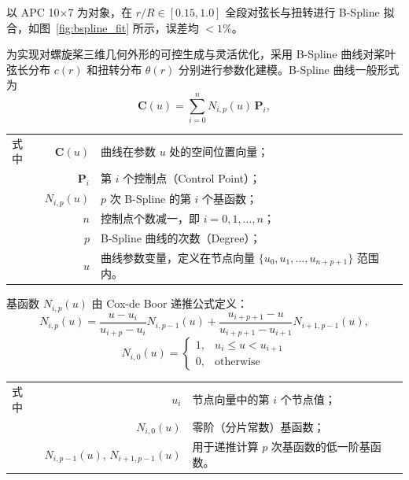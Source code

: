 以 APC 10$\times$7 为对象，在 $r/R \in [0.15, 1.0]$ 全段对弦长与扭转进行 B-Spline 拟合，如图~\ref{fig:bspline_fit} 所示，误差均 $< 1\%$。

为实现对螺旋桨三维几何外形的可控生成与灵活优化，采用 B-Spline 曲线对桨叶弦长分布 $c(r)$ 和扭转分布 $\theta(r)$ 分别进行参数化建模。B-Spline 曲线一般形式为
\begin{equation}
\mathbf{C}(u) = \sum_{i=0}^{n} N_{i,p}(u)\,\mathbf{P}_i,
\end{equation}

\noindent
\begin{tabularx}{\textwidth}{@{}l@{\quad}r@{———}X@{}}
式中 & $\mathbf{C}(u)$      & 曲线在参数 $u$ 处的空间位置向量；\\
     & $\mathbf{P}_i$       & 第 $i$ 个控制点（Control Point）；\\
     & $N_{i,p}(u)$         & $p$ 次 B-Spline 的第 $i$ 个基函数；\\
     & $n$                  & 控制点个数减一，即 $i=0,1,\dots,n$；\\
     & $p$                  & B-Spline 曲线的次数（Degree）；\\
     & $u$                  & 曲线参数变量，定义在节点向量 $\{u_0,u_1,\dots,u_{n+p+1}\}$ 范围内。\\
\end{tabularx}\vspace{3.15bp}

基函数 $N_{i,p}(u)$ 由 Cox-de Boor 递推公式定义：
\begin{equation}
N_{i,p}(u) = \frac{u - u_i}{u_{i+p} - u_i} N_{i,p-1}(u) + \frac{u_{i+p+1} - u}{u_{i+p+1} - u_{i+1}} N_{i+1,p-1}(u),
\end{equation}
\begin{equation}
N_{i,0}(u) = \begin{cases} 1, & u_i \leq u < u_{i+1} \\ 0, & \text{otherwise} \end{cases}
\end{equation}

\noindent
\begin{tabularx}{\textwidth}{@{}l@{\quad}r@{———}X@{}}
式中 & $u_i$                              & 节点向量中的第 $i$ 个节点值；\\
     & $N_{i,0}(u)$                       & 零阶（分片常数）基函数；\\
     & $N_{i,p-1}(u),\,N_{i+1,p-1}(u)$    & 用于递推计算 $p$ 次基函数的低一阶基函数。\\
\end{tabularx}\vspace{3.15bp}


